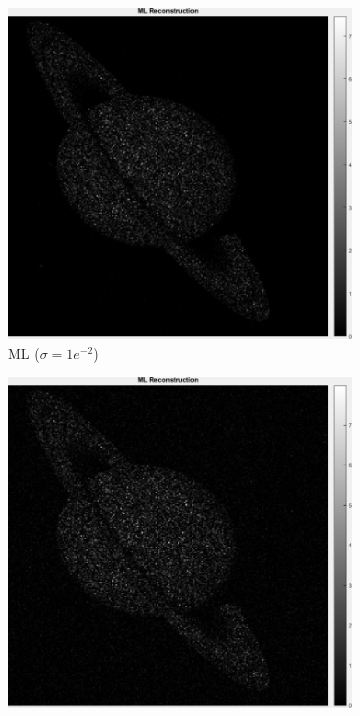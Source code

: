 \documentclass[a4paper, 11pt]{article}
\begin{document}
\begin{figure}[h]
\centering
\centering
    \begin{subfigure}[b]{0.22\textwidth}
        \includegraphics[width=\textwidth]{../Figures/MLReconstructionNoiseSigma1e-2.png}
        \caption{ML ($\sigma=1e^{-2}$)}
        \label{fig:ML-3}
    \end{subfigure}
    \begin{subfigure}[b]{0.22\textwidth}
        \includegraphics[width=\textwidth]{../Figures/MLReconstructionNoiseSigma1e-1.png}

\end{subfigure}
\end{figure}
\end{document}

